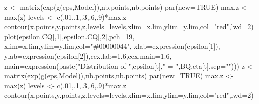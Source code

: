 \documentclass[
]{book}
\newenvironment{Shaded}{\begin{snugshade}}{\end{snugshade}}
\newcommand{\AttributeTok}[1]{\textcolor[rgb]{0.77,0.63,0.00}{#1}}
\newcommand{\ConstantTok}[1]{\textcolor[rgb]{0.00,0.00,0.00}{#1}}
\newcommand{\DecValTok}[1]{\textcolor[rgb]{0.00,0.00,0.81}{#1}}
\newcommand{\FloatTok}[1]{\textcolor[rgb]{0.00,0.00,0.81}{#1}}
\newcommand{\FunctionTok}[1]{\textcolor[rgb]{0.00,0.00,0.00}{#1}}
\newcommand{\NormalTok}[1]{#1}
\newcommand{\OtherTok}[1]{\textcolor[rgb]{0.56,0.35,0.01}{#1}}
\newcommand{\SpecialCharTok}[1]{\textcolor[rgb]{0.00,0.00,0.00}{#1}}
\newcommand{\StringTok}[1]{\textcolor[rgb]{0.31,0.60,0.02}{#1}}
\theoremstyle{definition}
\theoremstyle{definition}
\theoremstyle{definition}
\theoremstyle{definition}
\theoremstyle{remark}
\begin{document}
\begin{Shaded}
\begin{Highlighting}[]
\NormalTok{z }\OtherTok{\textless{}{-}} \FunctionTok{matrix}\NormalTok{(}\FunctionTok{exp}\NormalTok{(}\FunctionTok{g}\NormalTok{(eps,Model)),nb.points,nb.points)}
\FunctionTok{par}\NormalTok{(}\AttributeTok{new=}\ConstantTok{TRUE}\NormalTok{)}
\NormalTok{max.z }\OtherTok{\textless{}{-}} \FunctionTok{max}\NormalTok{(z)}
\NormalTok{levels }\OtherTok{\textless{}{-}} \FunctionTok{c}\NormalTok{(.}\DecValTok{01}\NormalTok{,.}\DecValTok{1}\NormalTok{,.}\DecValTok{3}\NormalTok{,.}\DecValTok{6}\NormalTok{,.}\DecValTok{9}\NormalTok{)}\SpecialCharTok{*}\NormalTok{max.z}
\FunctionTok{contour}\NormalTok{(x.points,y.points,z,}\AttributeTok{levels=}\NormalTok{levels,}\AttributeTok{xlim=}\NormalTok{x.lim,}\AttributeTok{ylim=}\NormalTok{y.lim,}\AttributeTok{col=}\StringTok{"red"}\NormalTok{,}\AttributeTok{lwd=}\DecValTok{2}\NormalTok{)}
\FunctionTok{plot}\NormalTok{(epsilon.CQ[,}\DecValTok{1}\NormalTok{],epsilon.CQ[,}\DecValTok{2}\NormalTok{],}\AttributeTok{pch=}\DecValTok{19}\NormalTok{,}
     \AttributeTok{xlim=}\NormalTok{x.lim,}\AttributeTok{ylim=}\NormalTok{y.lim,}\AttributeTok{col=}\StringTok{"\#00000044"}\NormalTok{,}
     \AttributeTok{xlab=}\FunctionTok{expression}\NormalTok{(epsilon[}\DecValTok{1}\NormalTok{]),}
     \AttributeTok{ylab=}\FunctionTok{expression}\NormalTok{(epsilon[}\DecValTok{2}\NormalTok{]),}\AttributeTok{cex.lab=}\FloatTok{1.6}\NormalTok{,}\AttributeTok{cex.main=}\FloatTok{1.6}\NormalTok{,}
     \AttributeTok{main=}\FunctionTok{expression}\NormalTok{(}\FunctionTok{paste}\NormalTok{(}\StringTok{"Distribution of "}\NormalTok{,epsilon[t],}\StringTok{" = "}\NormalTok{,BQ,eta[t],}\AttributeTok{sep=}\StringTok{""}\NormalTok{)))}
\NormalTok{z }\OtherTok{\textless{}{-}} \FunctionTok{matrix}\NormalTok{(}\FunctionTok{exp}\NormalTok{(}\FunctionTok{g}\NormalTok{(eps,Model)),nb.points,nb.points)}
\FunctionTok{par}\NormalTok{(}\AttributeTok{new=}\ConstantTok{TRUE}\NormalTok{)}
\NormalTok{max.z }\OtherTok{\textless{}{-}} \FunctionTok{max}\NormalTok{(z)}
\NormalTok{levels }\OtherTok{\textless{}{-}} \FunctionTok{c}\NormalTok{(.}\DecValTok{01}\NormalTok{,.}\DecValTok{1}\NormalTok{,.}\DecValTok{3}\NormalTok{,.}\DecValTok{6}\NormalTok{,.}\DecValTok{9}\NormalTok{)}\SpecialCharTok{*}\NormalTok{max.z}
\FunctionTok{contour}\NormalTok{(x.points,y.points,z,}\AttributeTok{levels=}\NormalTok{levels,}\AttributeTok{xlim=}\NormalTok{x.lim,}\AttributeTok{ylim=}\NormalTok{y.lim,}\AttributeTok{col=}\StringTok{"red"}\NormalTok{,}\AttributeTok{lwd=}\DecValTok{2}\NormalTok{)}
\end{Highlighting}
\end{Shaded}
\end{document}
